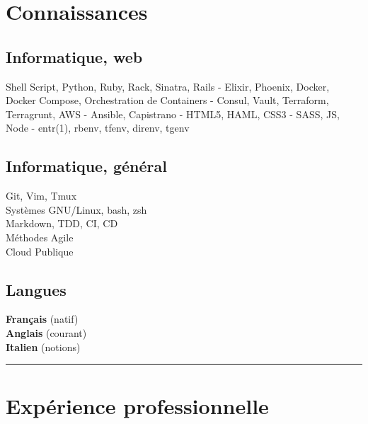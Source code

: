 \documentclass[a4paper,11pt]{article}
\newcommand{\breakvspace}[1]{\pagebreak[2]\vspace{#1}\pagebreak[2]}
\newcommand{\nobreakvspace}[1]{\nopagebreak[4]\vspace{#1}\nopagebreak[4]}
\newcommand{\spacedhrule}[2]{\breakvspace{#1}\hrule\nobreakvspace{#2}}
\begin{document}
\section*{Connaissances}
  \begin{minipage}[t]{0.29\textwidth}
    \subsection*{Informatique, web}
    Shell Script, Python, Ruby, Rack, Sinatra, Rails - Elixir, Phoenix, Docker, Docker Compose, Orchestration de Containers - Consul, Vault, Terraform, Terragrunt, AWS - Ansible, Capistrano - HTML5, HAML, CSS3 - SASS, JS, Node - entr(1), rbenv, tfenv, direnv, tgenv
  \end{minipage}
  \hspace{0.035\textwidth}
  \vrule
  \hspace{0.035\textwidth}
  \begin{minipage}[t]{0.28\textwidth}
    \subsection*{Informatique, général}
    Git, Vim, Tmux\\
    Systèmes GNU/Linux, bash, zsh\\
    Markdown, TDD, CI, CD\\
    Méthodes Agile \\
    Cloud Publique \\
  \end{minipage}
  \hspace{0.035\textwidth}
  \vrule
  \hspace{0.035\textwidth}
  \begin{minipage}[t]{0.28\textwidth}
    \subsection*{Langues}
    \textbf{Français} (natif)\\
    \textbf{Anglais} (courant)\\
    \textbf{Italien} (notions)
  \end{minipage}


\spacedhrule{1.5em}{-0.4em}

\section*{Expérience professionnelle}
\end{document}
